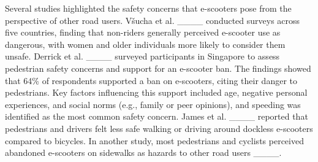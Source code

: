 Several studies highlighted the safety concerns that e-scooters pose from the perspective of other road users. Všucha et al. ____ conducted surveys across five countries, finding that non-riders generally perceived e-scooter use as dangerous, with women and older individuals more likely to consider them unsafe.
Derrick et al. ____ surveyed participants in Singapore to assess pedestrian safety concerns and support for an e-scooter ban. The findings showed that 64\% of respondents supported a ban on e-scooters, citing their danger to pedestrians. Key factors influencing this support included age, negative personal experiences, and social norms (e.g., family or peer opinions), and speeding was identified as the most common safety concern.
James et al. ____ reported that pedestrians and drivers felt less safe walking or driving around dockless e-scooters compared to bicycles. In another study, most pedestrians and cyclists perceived abandoned e-scooters on sidewalks as hazards to other road users ____.


